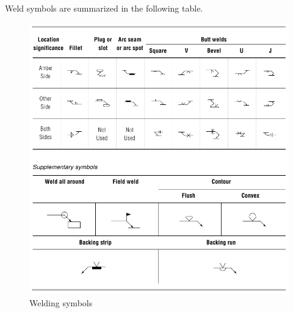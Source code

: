 Weld symbols are summarized in the following table.
\begin{figure}[H]
\centering
\includegraphics[width=.95\textwidth]{PIC/CH07/WST}
\caption{Welding symbols \citep{Gorenc2015}}
\end{figure}
